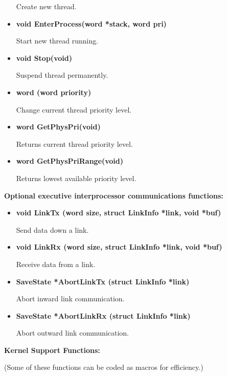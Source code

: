 \begin{itemize}
Create new thread.

\item {\bf void EnterProcess(word *stack, word pri)}

Start new thread running.

\item {\bf void Stop(void)}

Suspend thread permanently.

\item {\bf word \SetPhysPri(word priority)}

Change current thread priority level.

\item {\bf word GetPhysPri(void)}

Returns current thread priority level.

\item {\bf word GetPhysPriRange(void)}

Returns lowest available priority level.
\end{itemize}
\vspace{0.25cm}

{\bf Optional executive interprocessor communications functions:}
\vspace{0.25cm}

\begin{itemize}

\item {\bf void LinkTx (word size, struct LinkInfo *link, void *buf)}

Send data down a link.

\item {\bf void LinkRx (word size, struct LinkInfo *link, void *buf)} 

Receive data from a link.

\item {\bf SaveState *AbortLinkTx (struct LinkInfo *link)}

Abort inward link communication.

\item {\bf SaveState *AbortLinkRx (struct LinkInfo *link)}

Abort outward link communication.
\end{itemize}
\vspace{0.25cm}

{\bf Kernel Support Functions:} 
\vspace{0.25cm}

(Some of these functions can be coded as macros for efficiency.)
\vspace{0.25cm}

